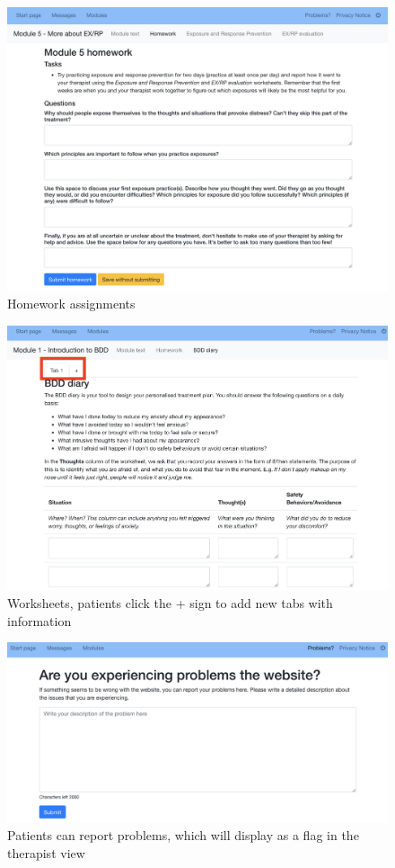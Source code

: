 \documentclass[]{book}
\begin{document}
\begin{figure}
\centering
\includegraphics{images/patient-homework.png}
\caption{Homework assignments}
\end{figure}

\begin{figure}
\centering
\includegraphics{images/patient-worksheet.png}
\caption{Worksheets, patients click the + sign to add new tabs with information}
\end{figure}

\begin{figure}
\centering
\includegraphics{images/patient-problems.png}
\caption{Patients can report problems, which will display as a flag in the therapist view}
\end{figure}
\end{document}
